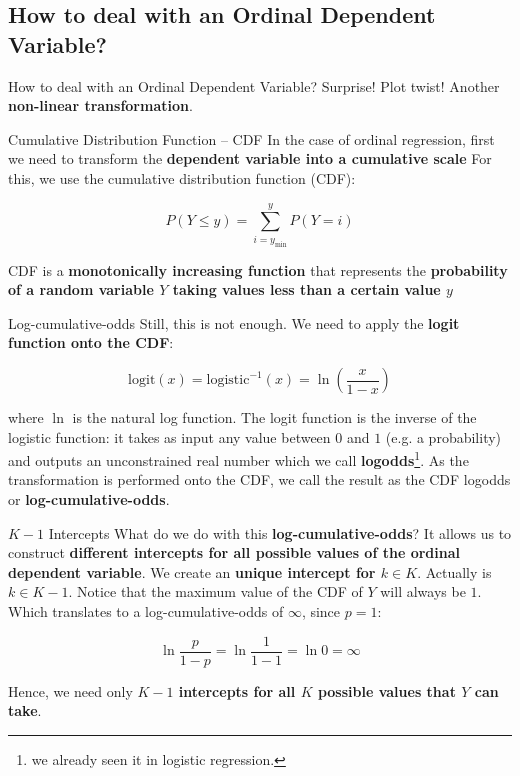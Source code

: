 \subsection{How to deal with an Ordinal Dependent Variable?}
\begin{frame}{How to deal with an Ordinal Dependent Variable?}
	Surprise! Plot twist!
	\vfill
	Another \textbf{non-linear transformation}.
\end{frame}

\begin{frame}{Cumulative Distribution Function -- CDF}
	In the case of ordinal regression,
	first we need to transform the \textbf{dependent variable into a
		cumulative scale}
	\vfill
	For this, we use the cumulative distribution function (CDF):

	$$P(Y \leq y) = \sum^y_{i=y_{\text{min}}} P(Y = i)$$

	CDF is a \textbf{monotonically increasing function} that represents the
	\textbf{probability of a random variable $Y$ taking values less than
		a certain value $y$}
\end{frame}

\begin{frame}{Log-cumulative-odds}
	Still, this is not enough.
	We need to apply the \textbf{logit function onto the CDF}:

	$$\mathrm{logit}(x) = \mathrm{logistic}^{-1}(x) = \ln\left(\frac{x}{1 -x}\right)$$

	where $\ln$ is the natural log function.
	\vfill
	The logit function is the inverse of the logistic function:
	it takes as input any value between $0$ and $1$ (e.g. a probability)
	and outputs an unconstrained real number which we call
	\textbf{logodds}\footnote{we already seen it in logistic regression.}.
	\vfill
	As the transformation is performed onto the CDF,
	we call the result as the CDF logodds or \textbf{log-cumulative-odds}.
\end{frame}

\begin{frame}{$K-1$ Intercepts}
	What do we do with this \textbf{log-cumulative-odds}?
	\vfill
	It allows us to construct \textbf{different intercepts for all possible
		values of the ordinal dependent variable}.
	We create an \textbf{unique intercept for $k \in K$}.
	\vfill
	Actually is $k \in K-1$.
	Notice that the maximum value of the CDF of $Y$ will always be $1$.
	Which translates to a log-cumulative-odds of $\infty$,
	since $p=1$:

	$$\ln \frac{p}{1-p} = \ln \frac{1}{1-1} = \ln 0 = \infty$$

	Hence, we need only \textbf{$K-1$ intercepts for all $K$ possible
		values that $Y$ can take}.
\end{frame}

